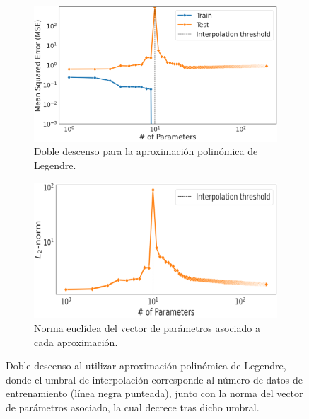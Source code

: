 \begin{figure}[h]
    \centering
    \begin{subfigure}[b]{0.48\textwidth}
        \centering
        \includegraphics[width=\textwidth]{img/experiments/legendre1DDD.png}
        \caption{Doble descenso para la aproximación polinómica de Legendre.}\label{fig:legendre1.1DDD}
    \end{subfigure}
    \hfill
    \begin{subfigure}[b]{0.48\textwidth}
        \centering
        \includegraphics[width=\textwidth]{img/experiments/legendre1.4.png}
        \caption{Norma euclídea del vector de parámetros asociado a cada aproximación.}\label{fig:legendre1.2DDD}
    \end{subfigure}
    \caption[Doble descenso al utilizar aproximación polinómica de Legendre y norma del vector de parámetros.]{Doble descenso al utilizar aproximación polinómica de Legendre, donde el umbral de interpolación corresponde al número de datos de entrenamiento (línea negra punteada), junto con la norma del vector de parámetros asociado, la cual decrece tras dicho umbral.}\label{fig:legendre1DDD}
\end{figure}

